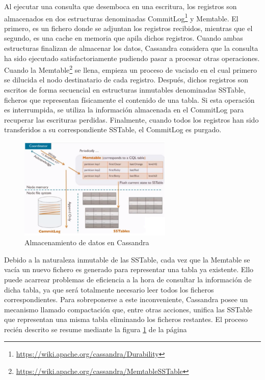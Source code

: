 Al ejecutar una consulta que desemboca en una escritura, los registros son almacenados en dos estructuras denominadas CommitLog\footnote{\url{https://wiki.apache.org/cassandra/Durability}} y Memtable. El primero, es un fichero donde se adjuntan los registros recibidos, mientras que el segundo, es una cache en memoria que apila dichos registros. Cuando ambas estructuras finalizan de almacenar los datos, Cassandra considera que la consulta ha sido ejecutado satisfactoriamente pudiendo pasar a procesar otras operaciones.\\

Cuando la Memtable\footnote{\url{https://wiki.apache.org/cassandra/MemtableSSTable}} se llena, empieza un proceso de vaciado en el cual primero se dilucida el nodo destinatario de cada registro. Después, dichos registros son escritos de forma secuencial en estructuras inmutables denominadas SSTable, ficheros que representan físicamente el contenido de una tabla. Si esta operación es interrumpida, se utiliza la información almacenada en el CommitLog para recuperar las escrituras perdidas. Finalmente, cuando todos los registros han sido transferidos a su correspondiente SSTable, el CommitLog es purgado.

\begin{figure}[h]
	\centering
	\includegraphics[width=0.65\textwidth]{Ilustraciones/cassandra_data_storage.png}
	\caption{Almacenamiento de datos en Cassandra}
	\label{fig:almacenamiento_cassandra}
\end{figure}

Debido a la naturaleza inmutable de las SSTable, cada vez que la Memtable se vacía un nuevo fichero es generado para representar una tabla ya existente. Ello puede acarrear problemas de eficiencia a la hora de consultar la información de dicha tabla, ya que será totalmente necesario leer todos los ficheros correspondientes. Para sobreponerse a este inconveniente, Cassandra posee un mecanismo llamado compactación que, entre otras acciones, unifica las SSTable que representan una misma tabla eliminando los ficheros restantes. El proceso recién descrito se resume mediante la figura \ref{fig:almacenamiento_cassandra} de la página \pageref{fig:almacenamiento_cassandra}

